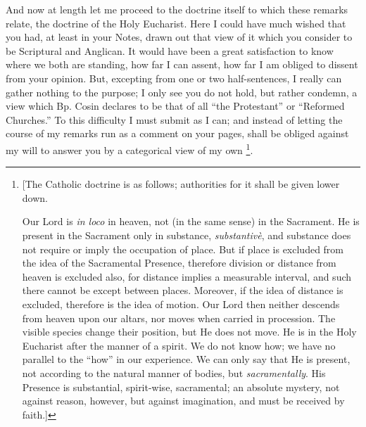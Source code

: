 And now at length let me proceed to the doctrine
itself to which these remarks relate, the doctrine of the Holy
Eucharist. Here I could have much wished that you had, at least
in your Notes, drawn out that view of it which you consider to be
Scriptural and Anglican. It would have been a great satisfaction to
know where we both are standing, how far I can assent, how far I am
obliged to dissent from your opinion. But, excepting from one or two
half-sentences, I really can gather nothing to the purpose; I only see
you do not hold, but rather condemn, a view which Bp. Cosin
declares to be that of all ``the Protestant'' or ``Reformed Churches.'' To
this difficulty I must submit as I can; and instead of letting the
course of my remarks run as a comment on your pages, shall be obliged
against my will to answer you by a categorical view of my own \footnote{[The Catholic doctrine is as follows;
authorities for it shall be given lower down.

Our Lord is \emph{in loco} in heaven, not (in the
same sense) in the Sacrament. He is present in the Sacrament only in
substance, \emph{substantivè}, and substance does not require or
imply the occupation of place. But if place is excluded from the idea
of the Sacramental Presence, therefore division or distance from
heaven is excluded also, for distance implies a measurable interval,
and such there cannot be except between places. Moreover, if the idea
of distance is excluded, therefore is the idea of motion. Our Lord
then neither descends from heaven upon our altars, nor moves when
carried in procession. The visible species change their position, but
He does not move. He is in the Holy Eucharist after the manner of a
spirit. We do not know how; we have no parallel to the ``how'' in our
experience. We can only say that He is present, not according to the
natural manner of bodies, but \emph{sacramentally}. His Presence is
substantial, spirit-wise, sacramental; an absolute mystery, not
against reason, however, but against imagination, and must be received
by faith.]}.

